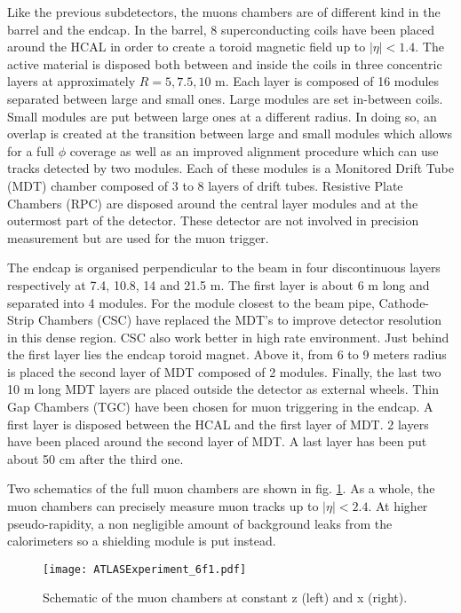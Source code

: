 Like the previous subdetectors, the muons chambers are of different kind in the barrel and the endcap.
In the barrel, 8 superconducting coils have been placed around the HCAL in order to create a toroid magnetic field up to $|\eta|<1.4$.
The active material is disposed both between and inside the coils in three concentric layers at approximately $R=5,7.5,10$ m.
Each layer is composed of 16 modules separated between large and small ones.
Large modules are set in-between coils.
Small modules are put between large ones at a different radius.
In doing so, an overlap is created at the transition between large and small modules which allows for a full $\phi$ coverage as well as an improved alignment procedure which can use tracks detected by two modules.
Each of these modules is a Monitored Drift Tube (MDT) chamber composed of 3 to 8 layers of drift tubes.
Resistive Plate Chambers (RPC) are disposed around the central layer modules and at the outermost part of the detector.
These detector are not involved in precision measurement but are used for the muon trigger.

The endcap is organised perpendicular to the beam in four discontinuous layers respectively at 7.4, 10.8, 14 and 21.5 m.
The first layer is about 6 m long and separated into 4 modules.
For the module closest to the beam pipe, Cathode-Strip Chambers (CSC) have replaced the MDT's to improve detector resolution in this dense region.
CSC also work better in high rate environment.
Just behind the first layer lies the endcap toroid magnet.
Above it, from 6 to 9 meters radius is placed the second layer of MDT composed of 2 modules.
Finally, the last two 10 m long MDT layers are placed outside the detector as external wheels.
Thin Gap Chambers (TGC) have been chosen for muon triggering in the endcap.
A first layer is disposed between the HCAL and the first layer of MDT.
2 layers have been placed around the second layer of MDT.
A last layer has been put about 50 cm after the third one.


Two schematics of the full muon chambers are shown in fig. \ref{fig:orgd7a60b3}.
As a whole, the muon chambers can precisely measure muon tracks up to $|\eta|<2.4$. %
At higher pseudo-rapidity, a non negligible amount of background leaks from the calorimeters so a shielding module is put instead.

\begin{figure}[htbp]
\centering
\texttt{[image: ATLASExperiment\_6f1.pdf]}
\caption{\label{fig:orgd7a60b3}
Schematic of the muon chambers at constant z (left) and x (right).\cite{ATLASExperiment}}
\end{figure}




